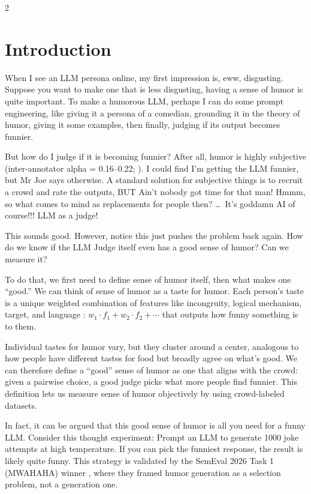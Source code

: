 \documentclass[10pt, a4paper]{article}
\begin{document}
\begin{multicols}{2}

\section{Introduction}

When I see an LLM persona online, my first impression is, eww, disgusting. Suppose you want to make one that is less disgusting, having a sense of humor is quite important. To make a humorous LLM, perhaps I can do some prompt engineering, like giving it a persona of a comedian, grounding it in the theory of humor, giving it some examples, then finally, judging if its output becomes funnier.

But how do I judge if it is becoming funnier? After all, humor is highly subjective (inter-annotator alpha = 0.16--0.22; \cite{castro2018,chiruzzo2019}). I could find I'm getting the LLM funnier, but Mr Joe says otherwise. A standard solution for subjective things is to recruit a crowd and rate the outputs, BUT Ain't nobody got time for that man! Hmmm, so what comes to mind as replacements for people then? \ldots\ It's goddamn AI of course!!! LLM as a judge!

This sounds good. However, notice this just pushes the problem back again. How do we know if the LLM Judge itself even has a good sense of humor? Can we measure it?

To do that, we first need to define sense of humor itself, then what makes one ``good.'' We can think of sense of humor as a taste for humor. Each person's taste is a unique weighted combination of features like incongruity, logical mechanism, target, and language \cite{attardo1991,warren2016}: $w_1{\cdot}f_1 + w_2{\cdot}f_2 + \cdots$ that outputs how funny something is to them.

Individual tastes for humor vary, but they cluster around a center, analogous to how people have different tastes for food but broadly agree on what's good. We can therefore define a ``good'' sense of humor as one that aligns with the crowd: given a pairwise choice, a good judge picks what more people find funnier. This definition lets us measure sense of humor objectively by using crowd-labeled datasets.

In fact, it can be argued that this good sense of humor is all you need for a funny LLM. Consider this thought experiment: Prompt an LLM to generate 1000 joke attempts at high temperature. If you can pick the funniest response, the result is likely quite funny. This strategy is validated by the SemEval 2026 Task 1 (MWAHAHA) winner \cite{semeval2026}, where they framed humor generation as a selection problem, not a generation one.


\end{multicols}
\end{document}
